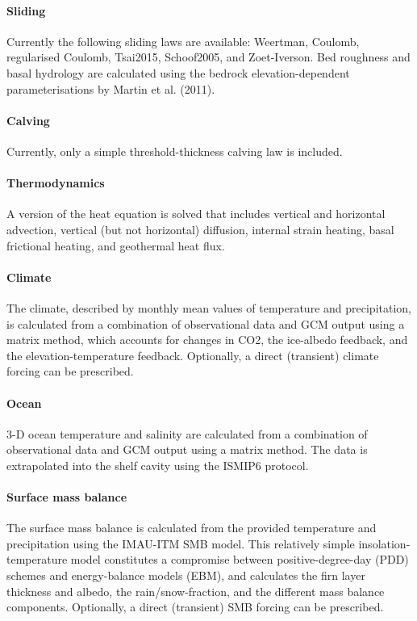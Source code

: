 \documentclass{article}
\begin{document}
\paragraph{Sliding}
Currently the following sliding laws are available: Weertman, Coulomb, regularised Coulomb, Tsai2015, Schoof2005, and Zoet-Iverson. Bed roughness and basal hydrology are calculated using the bedrock elevation-dependent parameterisations by Martin et al. (2011).

\paragraph{Calving}
Currently, only a simple threshold-thickness calving law is included.

\paragraph{Thermodynamics}
A version of the heat equation is solved that includes vertical and horizontal advection, vertical (but not horizontal) diffusion, internal strain heating, basal frictional heating, and geothermal heat flux.

\paragraph{Climate}
The climate, described by monthly mean values of temperature and precipitation, is calculated from a combination of observational  data and GCM output using a matrix method, which accounts for changes in CO2, the ice-albedo feedback, and the elevation-temperature feedback. Optionally, a direct (transient) climate forcing can be prescribed.

\paragraph{Ocean}
3-D ocean temperature and salinity are calculated from a combination of observational data and GCM output using a matrix method. The data is extrapolated into the shelf cavity using the ISMIP6 protocol.

\paragraph{Surface mass balance}
The surface mass balance is calculated from the provided temperature and precipitation using the IMAU-ITM SMB model. This relatively simple insolation-temperature model constitutes a compromise between positive-degree-day (PDD) schemes and energy-balance models (EBM), and calculates the firn layer thickness and albedo, the rain/snow-fraction, and the different mass balance components. Optionally, a direct (transient) SMB forcing can be prescribed.
\end{document}
